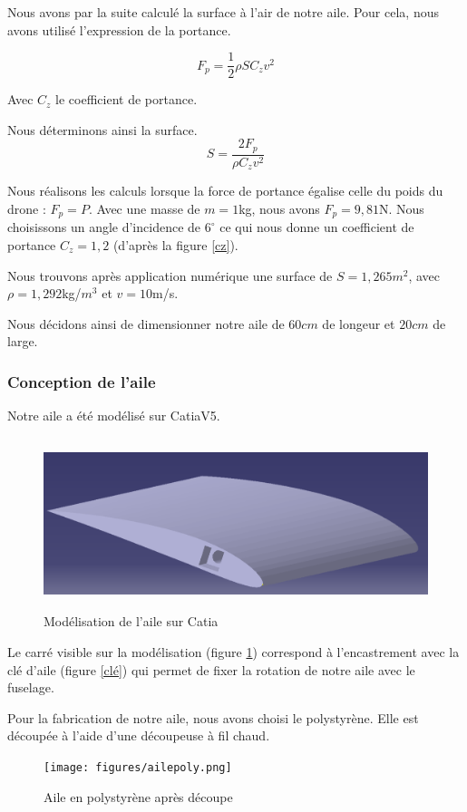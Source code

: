 \documentclass[a4paper,12pt,french]{report}
\begin{document}
Nous avons par la suite calculé la surface à l'air de notre aile. Pour cela, nous avons utilisé l'expression de la portance.

$$ F_p=\frac{1}{2}\rho S C_z v^2$$

Avec $C_z$ le coefficient de portance.

Nous déterminons ainsi la surface.
$$S=\frac{2F_p}{\rho C_z v^2}$$

Nous réalisons les calculs lorsque la force de portance égalise celle du poids du drone : $F_p=P.$ Avec une masse de $m=1$kg, nous avons $F_p=9,81$N. Nous choisissons un angle d'incidence de $6^\circ$ ce qui nous donne un coefficient de portance $C_z=1,2$ (d'après la figure \ref{cz}).\newline

Nous trouvons après application numérique une surface de $S=1,265$$m^2$, avec $\rho=1,292$kg/$m^3$ et $v=10$m/s.\newline

    Nous décidons ainsi de dimensionner notre aile de $60cm$ de longeur et $20cm$ de large.

    \subsubsection*{Conception de l'aile}

    Notre aile a été modélisé sur CatiaV5.

    \begin{figure}[h]
        \centering
        \includegraphics[height=5cm]{figures/ailec.png}
        \caption{Modélisation de l'aile sur Catia}
        \label{aile}
    \end{figure}
    \newpage

    Le carré visible sur la modélisation (figure \ref{aile}) correspond à l'encastrement avec la clé d'aile (figure \ref{clé}) qui permet de fixer la rotation de notre aile avec le fuselage.\newline

    Pour la fabrication de notre aile, nous avons choisi le polystyrène. Elle est découpée à l'aide d'une découpeuse à fil chaud.
    \label{ailefini}
    \begin{figure}[h]
        \centering
        \texttt{[image: figures/ailepoly.png]}
        \caption{Aile en polystyrène après découpe}
        \label{ailepoly}
    \end{figure}
\end{document}
